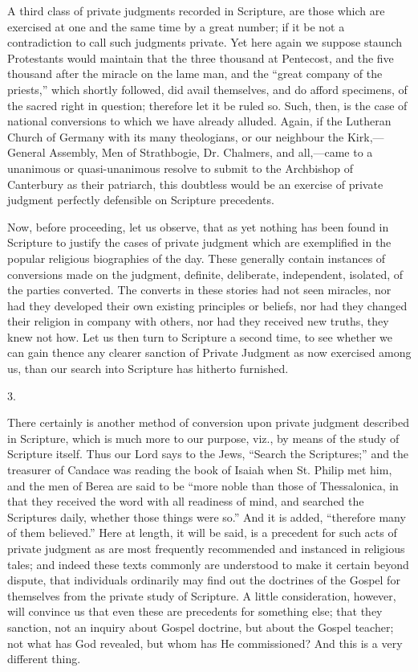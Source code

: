 A third class of private judgments recorded in Scripture, are those
which are exercised at one and the same time by a great number; if it
be not a contradiction to call such judgments private. Yet here again
we suppose staunch Protestants would maintain that the three thousand
at Pentecost, and the five thousand after the miracle on the lame man,
and the ``great company of the priests,'' which shortly
followed, did avail themselves, and do afford specimens, of the sacred
right in question; therefore let it be ruled so. Such, then, is the
case of national conversions to which we have already alluded. Again,
if the Lutheran Church of Germany with its many theologians, or our
neighbour the Kirk,—General Assembly, Men of Strathbogie, Dr.
Chalmers, and all,—came to a unanimous or quasi-unanimous resolve to
submit to the Archbishop of Canterbury as their patriarch, this
doubtless would be an exercise of private judgment perfectly
defensible on Scripture precedents.

Now, before proceeding, let us observe, that as yet nothing has
been found in Scripture to justify the cases of private judgment which
are exemplified in the popular religious biographies of the day. These
generally contain instances of conversions made on the judgment,
definite, deliberate, independent, isolated, of the parties
converted. The converts in these stories had not seen miracles, nor
had they developed their own existing principles or beliefs, nor had
they changed their religion in company with others, nor had they
received new truths, they knew not how. Let us then turn to Scripture
a second time, to see whether we can gain thence any clearer
sanction of Private Judgment as now exercised among us, than our
search into Scripture has hitherto furnished.

3.

There certainly is another method of conversion upon private
judgment described in Scripture, which is much more to our purpose,
viz., by means of the study of Scripture itself. Thus our Lord says to
the Jews, ``Search the Scriptures;'' and the treasurer of
Candace was reading the book of Isaiah when St. Philip met him, and
the men of Berea are said to be ``more noble than those of
Thessalonica, in that they received the word with all readiness of
mind, and searched the Scriptures daily, whether those things were
so.'' And it is added, ``therefore many of them
believed.'' Here at length, it will be said, is a precedent for
such acts of private judgment as are most frequently recommended and
instanced in religious tales; and indeed these texts commonly are
understood to make it certain beyond dispute, that individuals
ordinarily may find out the doctrines of the Gospel for themselves
from the private study of Scripture. A little consideration, however,
will convince us that even these are precedents for something else;
that they sanction, not an inquiry about Gospel doctrine, but about
the Gospel teacher; not what has God revealed, but whom has He
commissioned? And this is a very different thing.

